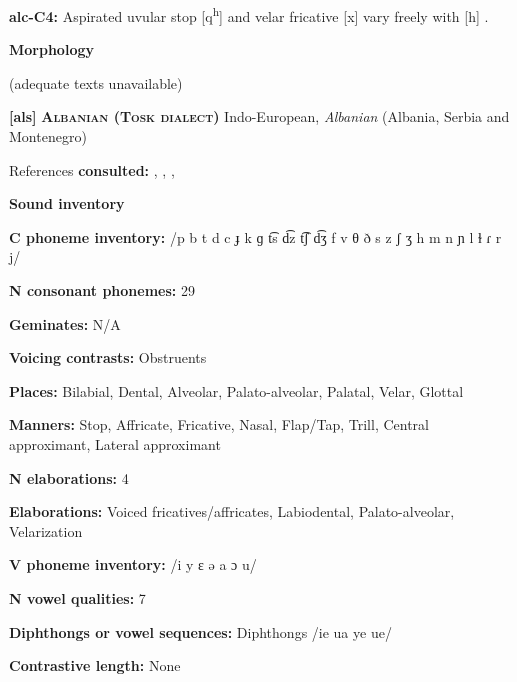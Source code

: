 \textbf{alc-C4:} Aspirated uvular stop [q\textsuperscript{h}] and velar fricative [x] vary freely with [h] \citep[377-8]{Clairis1985}.



\textbf{Morphology}



(adequate texts unavailable)



\textbf{[als]}   \textbf{\textsc{Albanian (Tosk dialect)}}  Indo-European, \textit{Albanian} (Albania, Serbia and Montenegro)



References \textbf{consulted:} \citet{Bevington1974}, \citet{Klippenstein2010}, \citet{Newmark1957}, \citet{NewmarkEtAl1982}



\textbf{Sound inventory}



\textbf{C phoneme inventory:} /p b t d c ɟ k ɡ t͡s d͡z t͡ʃ d͡ʒ f v θ ð s z ʃ ʒ h m n ɲ l ɫ ɾ r j/



\textbf{N consonant phonemes:} 29



\textbf{Geminates:} N/A



\textbf{Voicing contrasts:} Obstruents



\textbf{Places:} Bilabial, Dental, Alveolar, Palato-alveolar, Palatal, Velar, Glottal



\textbf{Manners:} Stop, Affricate, Fricative, Nasal, Flap/Tap, Trill, Central approximant, Lateral approximant



\textbf{N elaborations:} 4



\textbf{Elaborations:} Voiced fricatives/affricates, Labiodental, Palato-alveolar, Velarization



\textbf{V phoneme inventory:} /i y ɛ ə a ɔ u/



\textbf{N vowel qualities:} 7



\textbf{Diphthongs or vowel sequences:} Diphthongs /ie ua ye ue/



\textbf{Contrastive length:} None



